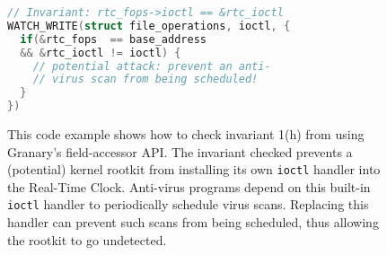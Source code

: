 \documentclass[letterpaper,twocolumn,10pt]{article}
\let\ORIGcaption\caption
\renewcommand{\caption}[2][\compressedcaption]{%
\def\compressedcaption{#2}%
    \vspace{-12pt}%
    \ORIGcaption[#1]{#2}}
\begin{document}
\begin{figure}
\begin{lstlisting}[language=C,basicstyle=\footnotesize\ttfamily]
// Invariant: rtc_fops->ioctl == &rtc_ioctl
WATCH_WRITE(struct file_operations, ioctl, {
  if(&rtc_fops  == base_address
  && &rtc_ioctl != ioctl) {
    // potential attack: prevent an anti-
    // virus scan from being scheduled!
  }
})
\end{lstlisting}
\caption{\label{fig:field_invariant_check}This code example shows how to check invariant 1(h) from \cite{GibraltarKernelInvariants} using Granary's field-accessor API. The invariant checked prevents a (potential) kernel rootkit from installing its own \texttt{ioctl} handler into the Real-Time Clock. Anti-virus programs depend on this built-in \texttt{ioctl} handler to periodically schedule virus scans. Replacing this handler can prevent such scans from being scheduled, thus allowing the rootkit to go undetected.}
\end{figure}







\end{document}
